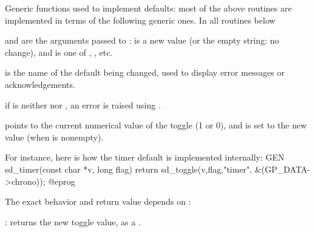 










\noindent Generic functions used to implement defaults: most of the above
routines are implemented in terms of the following generic ones. In all
routines below

\item {} and  are the arguments passed to :
 is a new value (or the empty string: no change), and  is one
of , , etc.

\item {} is the name of the default being changed, used to display error
messages or acknowledgements.


\item if  is neither  nor , an error is raised using
.

\item {} points to the current numerical value of the toggle (1 or 0),
and is set to the new value (when  is nonempty).

For instance, here is how the timer default is implemented internally:
\bprog
GEN
sd_timer(const char *v, long flag)
{ return sd_toggle(v,flag,"timer", &(GP_DATA->chrono)); }
@eprog

The exact behavior and return value depends on :

\item {}: returns the new toggle value, as a .

